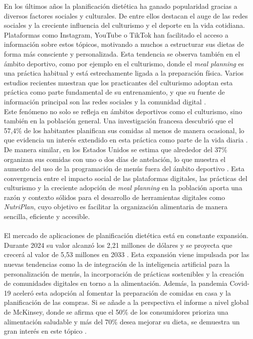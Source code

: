 \documentclass[12pt,a4paper]{report} %
\begin{document}
	En los últimos años la planificación dietética ha ganado popularidad gracias a diversos factores sociales y culturales. De entre ellos destacan el auge de las redes sociales y la creciente influencia del culturismo y el deporte en la vida cotidiana. Plataformas como Instagram, YouTube o TikTok han facilitado el acceso a información sobre estos tópicos, motivando a muchos a estructurar sus dietas de forma más consciente y personalizada. Esta tendencia se observa también en el ámbito deportivo, como por ejemplo en el culturismo, donde el \textit{meal planning} es una práctica habitual y está estrechamente ligada a la preparación física. Varios estudios recientes muestran que los practicantes del culturismo adoptan esta práctica como parte fundamental de su entrenamiento, y que su fuente de información principal son las redes sociales y la comunidad digital \cite{helms2019,masoga2021,benjamins2021}.
	\\	
	Este fenómeno no solo se refleja en ámbitos deportivos como el culturismo, sino también en la población general. Una investigación francesa descubrió que el 57,4\% de los habitantes planifican sus comidas al menos de manera ocasional, lo que evidencia un interés extendido en esta práctica como parte de la vida diaria \cite{ducrot2017}. De manera similar, en los Estados Unidos se estima que alrededor del 37\% organizan sus comidas con uno o dos días de antelación, lo que muestra el aumento del uso de la programación de menús fuera del ámbito deportivo \cite{fmi2015}. Esta convergencia entre el impacto social de las plataformas digitales, las prácticas del culturismo y la creciente adopción de \textit{meal planning} en la población aporta una razón y contexto sólidos para el desarrollo de herramientas digitales como \textit{NutriPlan}, cuyo objetivo es facilitar la organización alimentaria de manera sencilla, eficiente y accesible.
	\\\\
	El mercado de aplicaciones de planificación dietética está en constante expansión. Durante 2024 su valor alcanzó los 2,21 millones de dólares y se proyecta que crecerá al valor de 5,53 millones en 2033 \cite{businessresearchinsights2024}. Esta expansión viene impulsada por las nuevas tendencias como la de integración de la inteligencia artificial para la personalización de menús, la incorporación de prácticas sostenibles y la creación de comunidades digitales en torno a la alimentación. Además, la pandemia Covid-19 aceleró esta adopción al fomentar la preparación de comidas en casa y la planificación de las compras. Si se añade a la perspectiva el informe a nivel global de McKinsey, donde se afirma que el 50\% de los consumidores prioriza una alimentación saludable y más del 70\% desea mejorar su dieta, se demuestra un gran interés en este tópico \cite{mckinsey2023}.
\end{document}
